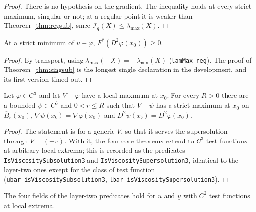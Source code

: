 \begin{proof}
\leanok
{}
There is no hypothesis on the gradient. The inequality holds at every strict
maximum, singular or not; at a regular point it is weaker than
Theorem~\ref{thm:regsub}, since $\mathcal{I}_q(X) \le \lambda_{\max}(X)$.
\end{proof}


\begin{theorem}\label{thm:singsup}
\leanok
At a strict minimum of $\underline{u} - \varphi$,
$F^*(D^2\varphi(x_0)) \ge 0$.
\end{theorem}

\begin{proof}
\leanok
{}
By transport, using $\lambda_{\max}(-X) = -\lambda_{\min}(X)$
(\texttt{lamMax\_neg}). The proof of Theorem~\ref{thm:singsub} is the longest
single declaration in the development, and its first version timed out.
\end{proof}


\begin{theorem}\label{thm:regularize}
\leanok
Let $\varphi \in C^3$ and let $V - \varphi$ have a local maximum at $x_0$. For
every $R > 0$ there are a bounded $\psi \in C^3$ and $0 < r \le R$ such that
$V - \psi$ has a strict maximum at $x_0$ on $\overline{B}_r(x_0)$,
$\nabla\psi(x_0) = \nabla\varphi(x_0)$ and
$D^2\psi(x_0) = D^2\varphi(x_0)$.
\end{theorem}

\begin{proof}
\leanok
The statement is for a generic $V$, so that it serves the supersolution through
$V = \overline{(-u)}$. With it, the four core theorems extend to $C^3$ test
functions at arbitrary local extrema; this is recorded as the predicates
\texttt{IsViscositySubsolution3} and \texttt{IsViscositySupersolution3},
identical to the layer-two ones except for the class of test function
(\texttt{ubar\_isViscositySubsolution3},
\texttt{lbar\_isViscositySupersolution3}).
\end{proof}


\begin{theorem}\label{thm:c2reduce}
\leanok
The four fields of the layer-two predicates hold for $\overline{u}$ and
$\underline{u}$ with $C^2$ test functions at local extrema.
\end{theorem}

